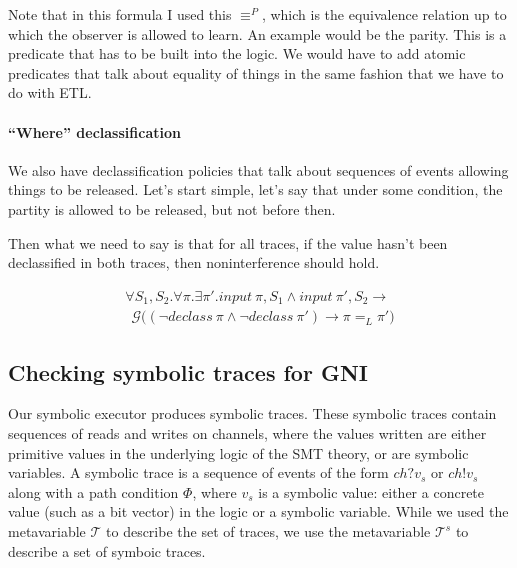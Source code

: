 \documentclass[conference]{IEEEtran}
\theoremstyle{definition}
\newcommand{\tset}{\ensuremath{\mathcal{T}}\xspace}
\newcommand{\tsets}{\ensuremath{\mathcal{T}^s}\xspace}
\newcommand{\talways}{\mathcal{G}}
\newcommand{\comment}[3][\color{red}]{{#1{[{#2}: {#3}]}}}
\newcommand{\kris}[1]{\comment[\color{orange}]{kris}{#1}}
\begin{document}
Note that in this formula I used this $\equiv^P$, which is the
equivalence relation up to which the observer is allowed to learn.  An
example would be the parity.  This is a predicate that has to be built
into the logic.  We would have to add atomic predicates that talk
about equality of things in the same fashion that we have to do with
ETL.

\paragraph*{``Where'' declassification}

\kris{Text out of date}

We also have declassification policies that talk about sequences of
events allowing things to be released.  Let's start simple, let's say
that under some condition, the partity is allowed to be released, but
not before then.

Then what we need to say is that for all traces, if the value hasn't
been declassified in both traces, then noninterference should hold.

\begin{Definition}
  \label{defn:hyper-noninterference}
  \begin{displaymath}
    \begin{array}{l}
      \forall S_1, S_2. \forall \pi. \exists \pi'. input~\pi,S_1 \land
      input~\pi',S_2 \rightarrow \\
      ~~\talways \big( (\lnot declass~\pi \land \lnot declass~\pi')
      \rightarrow \pi =_L \pi' \big)
    \end{array}
  \end{displaymath}
\end{Definition}

\subsection{Checking symbolic traces for GNI}

Our symbolic executor produces symbolic traces.  These symbolic traces
contain sequences of reads and writes on channels, where the values
written are either primitive values in the underlying logic of the SMT
theory, or are symbolic variables.  A symbolic trace is a sequence of
events of the form $ch?v_s$ or $ch!v_s$ along with a path condition
$\Phi$, where $v_s$ is a symbolic value: either a concrete value (such
as a bit vector) in the logic or a symbolic variable.  While we used
the metavariable \tset to describe the set of traces, we use the
metavariable \tsets to describe a set of symboic traces.
\end{document}
